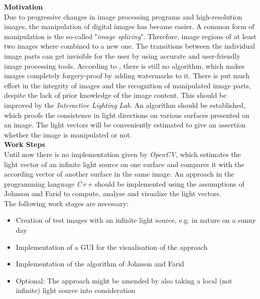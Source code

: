 \textbf{Motivation} \\
Due to progressive changes in image processing programs and high-resolution images, the manipulation of digital images has became easier. A common form of manipulation is the so-called "\textit{image splicing}". Therefore, image regions of at least two images where combined to a new one. The transitions between the individual image parts can get invisible for the user by using accurate and user-friendly image processing tools.
According to \cite{Hsu2006DetectingIS}, there is still no algorithm, which makes images completely forgery-proof by adding watermarks to it. There is put much effort in the integrity of images and the recognition of manipulated image parts, despite the lack of prior knowledge of the image content. This should be improved by the \textit{Interactive Lighting Lab}. An algorithm should be established, which proofs the consistence in light directions on various surfaces presented on an image. The light vectors will be conveniently estimated to give an assertion whether the image is manipulated or not.\\

\textbf{Work Steps} \\
Until now there is no implementation given by \textit{OpenCV}, which estimates the light vector of an infinite light source on one surface and compares it with the according vector of another surface in the same image. An approach in the programming language \textit{C++} should be implemented using the assumptions of Johnson and Farid \cite{Johnson} to compute, analyse and visualize the light vectors. \\The following work stages are necessary: 

\begin{itemize}
\item Creation of test images with an infinite light source, e.g. in nature on a sunny day 
\item Implementation of a GUI for the visualisation of the approach
\item Implementation of the algorithm of Johnson and Farid \cite{Johnson}
\item Optional: The approach might be amended by also taking a local (not infinite) light source into consideration \cite{Johnson}
\end{itemize}


